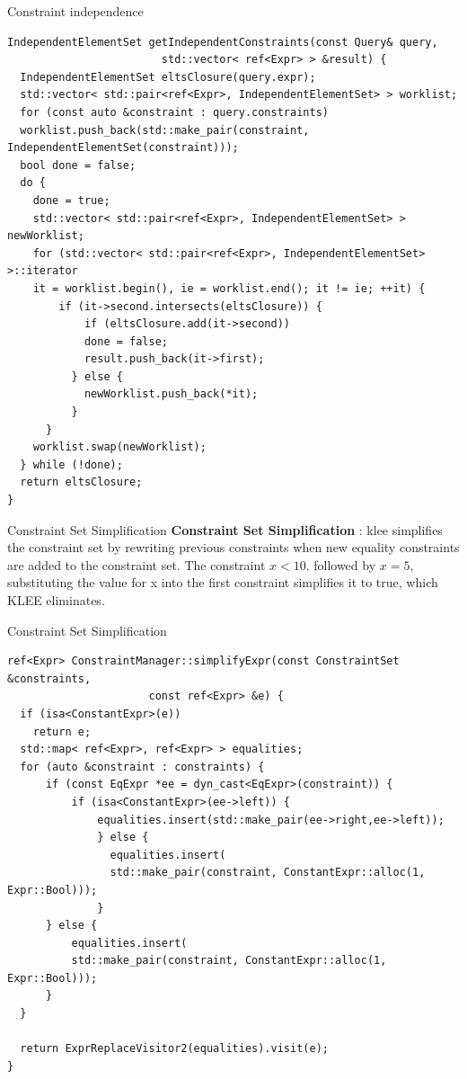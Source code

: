 \documentclass[9pt,aspectratio=43,mathserif,table]{beamer}
\begin{document}
\begin{frame}[fragile]{Constraint independence}
	\begin{lstlisting}
IndependentElementSet getIndependentConstraints(const Query& query,
                        std::vector< ref<Expr> > &result) {
  IndependentElementSet eltsClosure(query.expr);
  std::vector< std::pair<ref<Expr>, IndependentElementSet> > worklist;
  for (const auto &constraint : query.constraints)
  worklist.push_back(std::make_pair(constraint, IndependentElementSet(constraint)));
  bool done = false;
  do {
    done = true;
    std::vector< std::pair<ref<Expr>, IndependentElementSet> > newWorklist;
    for (std::vector< std::pair<ref<Expr>, IndependentElementSet> >::iterator
    it = worklist.begin(), ie = worklist.end(); it != ie; ++it) {
        if (it->second.intersects(eltsClosure)) {
            if (eltsClosure.add(it->second))
            done = false;
            result.push_back(it->first);
          } else {
            newWorklist.push_back(*it);
          }
      }
    worklist.swap(newWorklist);
  } while (!done);
  return eltsClosure;
}
  \end{lstlisting}
\end{frame}

\begin{frame}{Constraint Set Simplification}
	\textbf{Constraint Set Simplification} : klee simplifies the constraint set by rewriting previous
	constraints when new equality constraints are added to the
	constraint set. The constraint $x <10$. followed by $x=5$, substituting the value for
	x into the first constraint simplifies it to true, which KLEE eliminates.
\end{frame}

\begin{frame}[fragile]{Constraint Set Simplification}
	\begin{lstlisting}
ref<Expr> ConstraintManager::simplifyExpr(const ConstraintSet &constraints,
                      const ref<Expr> &e) {
  if (isa<ConstantExpr>(e))
    return e;
  std::map< ref<Expr>, ref<Expr> > equalities;
  for (auto &constraint : constraints) {
      if (const EqExpr *ee = dyn_cast<EqExpr>(constraint)) {
          if (isa<ConstantExpr>(ee->left)) {
              equalities.insert(std::make_pair(ee->right,ee->left));
              } else {
                equalities.insert(
                std::make_pair(constraint, ConstantExpr::alloc(1, Expr::Bool)));
              }
      } else {
          equalities.insert(
          std::make_pair(constraint, ConstantExpr::alloc(1, Expr::Bool)));
      }
  }

  return ExprReplaceVisitor2(equalities).visit(e);
}
      \end{lstlisting}
\end{frame}
\end{document}

